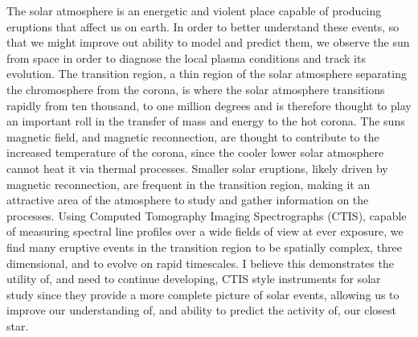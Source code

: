 The solar atmosphere is an energetic and violent place capable of producing eruptions that affect us on earth.
In order to better understand these events, so that we might improve out ability to model and predict them, we observe the sun from space in order to diagnose the local plasma conditions and track its evolution.
The transition region, a thin region of the solar atmosphere separating the chromosphere from the corona, is where the solar atmosphere transitions rapidly from ten thousand, to one million degrees and is therefore thought to play an important roll in the transfer of mass and energy to the hot corona.
The suns magnetic field, and magnetic reconnection, are thought to contribute to the increased temperature of the corona, since the cooler lower solar atmosphere cannot heat it via thermal processes.
Smaller solar eruptions, likely driven by magnetic reconnection, are frequent in the transition region, making it an attractive area of the atmosphere to study and gather information on the processes.
Using Computed Tomography Imaging Spectrographs (CTIS), capable of measuring spectral line profiles over a wide fields of view at ever exposure, we find many eruptive events in the transition region to be spatially complex, three dimensional, and to evolve on rapid timescales.
I believe this demonstrates the utility of, and need to continue developing, CTIS style instruments for solar study since they provide a more complete picture of solar events, allowing us to improve our understanding of, and ability to predict the activity of, our closest star.

